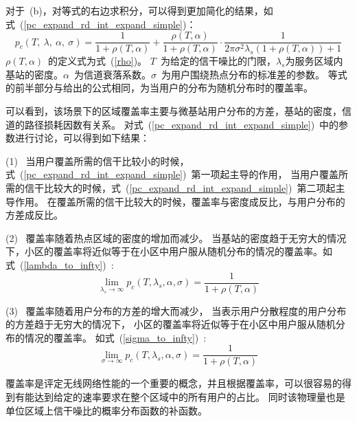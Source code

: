 对于~(b)，对等式的右边求积分，可以得到更加简化的结果，如式~(\ref{pc_expand_rd_int_expand_simple})：
\begin{equation}\label{pc_expand_rd_int_expand_simple}
p_c(T,~\lambda,~\alpha,~\sigma) = \frac{1}{1+\rho(T,\alpha)} + \frac{\rho(T,\alpha)}{1+\rho(T,\alpha)}\cdot\frac{1}{2\pi\sigma^2\lambda_s(1+\rho(T,\alpha))+1}
\end{equation}
$\rho(T,\alpha)$~的定义式为式~(\ref{rho})。
$T$~为给定的信干噪比的门限，$\lambda_s$为服务区域内基站的密度。$\alpha$~为信道衰落系数。$\sigma$~为用户围绕热点分布的标准差的参数。
等式的前半部分与\cite{ATractable}给出的公式相同，为当用户的分布为随机分布时的覆盖率。

可以看到，该场景下的区域覆盖率主要与微基站用户分布的方差，基站的密度，信道的路径损耗因数有关系。
对式~(\ref{pc_expand_rd_int_expand_simple})~中的参数进行讨论，可以得到如下结果：

(1) ~当用户覆盖所需的信干比较小的时候，式~(\ref{pc_expand_rd_int_expand_simple})~第一项起主导的作用，
当用户覆盖所需的信干比较大的时候，式~(\ref{pc_expand_rd_int_expand_simple})~第二项起主导作用。
在覆盖所需的信干比较大的时候，覆盖率与密度成反比，与用户分布的方差成反比。

(2) ~覆盖率随着热点区域的密度的增加而减少。
当基站的密度趋于无穷大的情况下，小区的覆盖率将近似等于在小区中用户服从随机分布的情况的覆盖率。如式~(\ref{lambda_to_infty})~:
\begin{equation}\label{lambda_to_infty}
  \lim_{\lambda_s \rightarrow \infty} p_c(T,\lambda_s,\alpha,\sigma) = \frac{1}{1+\rho(T, \alpha)}
\end{equation}

(3) ~覆盖率随着用户分布的方差的增大而减少，
当表示用户分散程度的用户分布的方差趋于无穷大的情况下，
小区的覆盖率将近似等于在小区中用户服从随机分布的情况的覆盖率。
如式~(\ref{sigma_to_infty})~:
\begin{equation}\label{sigma_to_infty}
  \lim_{\sigma \rightarrow \infty} p_c(T,\lambda_s,\alpha,\sigma) = \frac{1}{1+\rho(T, \alpha)}
\end{equation}

覆盖率是评定无线网络性能的一个重要的概念，并且根据覆盖率，可以很容易的得到有能达到给定的速率要求在整个区域中的所有用户的占比。
同时该物理量也是单位区域上信干噪比的概率分布函数的补函数。

